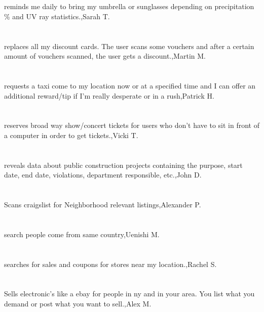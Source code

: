 \section{}reminds me daily to bring my umbrella or sunglasses depending on precipitation \% and UV ray statistics.,Sarah T.	
\section{}replaces all my discount cards. The user scans some vouchers and after a certain amount of vouchers scanned, the user gets a discount.,Martin M.	
\section{}requests a taxi come to my location now or at a specified time and I can offer an additional reward/tip if I'm really desperate or in a rush,Patrick H.	
\section{}reserves broad way show/concert tickets for users who don't have to sit in front of a computer in order to get tickets.,Vicki T.	
\section{}reveals data about public construction projects containing the purpose, start date, end date, violations, department responsible, etc.,John D.	
\section{}Scans craigslist for Neighborhood relevant listings,Alexander P.	
\section{}search people come from same country,Uenishi M.	
\section{}searches for sales and coupons for stores near my location.,Rachel S.	
\section{}Sells electronic's like a ebay for people in ny and in your area. You list what you demand or post what you want to sell.,Alex M.	
